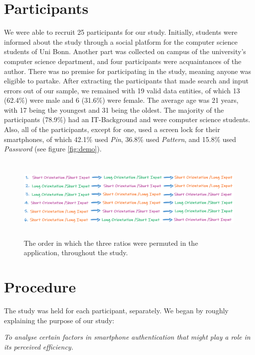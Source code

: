 \section{Participants} \label{5.2}

We were able to recruit 25 participants for our study. Initially, students were informed about the study through a social platform for the computer science students of Uni Bonn. Another part was collected on campus of the university's computer science department, and four participants were acquaintances of the author. There was no premise for participating in the study, meaning anyone was eligible to partake. After extracting the participants that made search and input errors out of our sample, we remained with 19 valid data entities, of which 13 (62.4\%) were male and 6 (31.6\%) were female. The average age was 21 years, with 17 being the youngest and 31 being the oldest. The majority of the participants (78.9\%) had an IT-Background and were computer science students. Also, all of the participants, except for one, used a screen lock for their smartphones, of which 42.1\% used \textit{Pin}, 36.8\% used \textit{Pattern}, and 15.8\% used \textit{Password} (see figure \ref{fig:demo}). 

\begin{figure}[t!]
\centering
\includegraphics[width=14cm, height=4cm]{Chapters/graphics/permutation.PNG}
\caption{The order in which the three ratios were permuted in the application, throughout the study.}
\label{fig:permutation}
\end{figure}


\section{Procedure} \label{5.3}
The study was held for each participant, separately. We began by roughly explaining the purpose of our study:

\begin{center}
\textit{To analyse certain factors in smartphone authentication that might play a role in its perceived efficiency.}    
\end{center}

